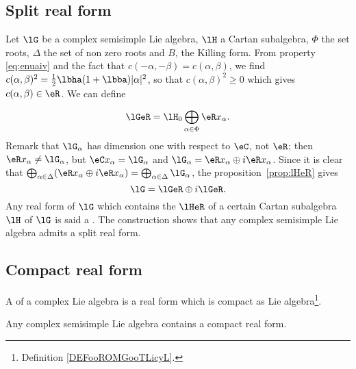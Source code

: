 \subsection{Split real form}

Let $\lG$ be a complex semisimple Lie algebra, $\lH$ a Cartan subalgebra, $\Phi$ the set roots, $\Delta$ the set of non zero roots and $B$, the Killing form. From property \eqref{eq:enuaiv} and the fact that $c(-\alpha,-\beta)=c(\alpha,\beta)$, we find $c(\alpha,\beta)^2=\frac{1}{2}\lbha(1+\lbba)|\alpha|^2$,
 so that $c(\alpha,\beta)^2\geq 0$ which gives $c(\alpha,\beta)\in\eR$. We can define

\[
   \lGeR=\lH_0\bigoplus_{\alpha\in\Phi}\eR x_{\alpha}.
\]
Remark that $\lG_{\alpha}$ has dimension one with respect to $\eC$, not $\eR$; then $\eR x_{\alpha}\neq\lG_{\alpha}$, but $\eC x_{\alpha}=\lG_{\alpha}$ and $\lG_{\alpha}=\eR x_{\alpha}\oplus i\eR x_{\alpha}$. Since it is clear that $\bigoplus_{\alpha\in\Delta}( \eR x_{\alpha}\oplus i\eR x_{\alpha} )=\bigoplus_{\alpha\in\Delta}\lG_{\alpha}$, the proposition~\ref{prop:lHeR} gives
\begin{equation}
  \lG=\lGeR\oplus i\lGeR.
\end{equation}
Any real form of $\lG$ which contains the $\lHeR$ of a certain Cartan subalgebra $\lH$ of $\lG$ is said a . The construction shows that any complex semisimple Lie algebra admits a split real form.

\subsection{Compact real form}

\begin{definition}
    A  of a complex Lie algebra is a real form which is compact as Lie algebra\footnote{Definition \ref{DEFooROMGooTLicyL}.}. 
\end{definition}

\begin{theorem}
Any complex semisimple Lie algebra contains a compact real form.
\end{theorem}

